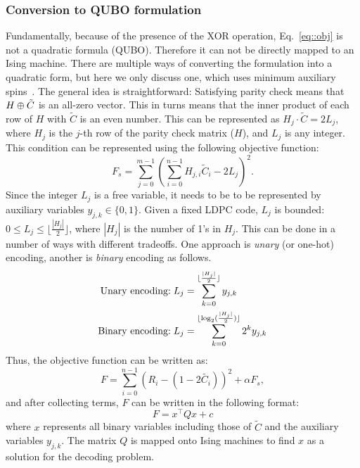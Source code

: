 \subsubsection{Conversion to QUBO formulation}
Fundamentally, because of the presence of the XOR operation, Eq.~\ref{eq::obj}
is not a quadratic formula (\eg QUBO). Therefore it can not be directly mapped
to an Ising machine. There are multiple ways of converting the formulation into
a quadratic form, but here we only discuss one, which uses minimum auxiliary
spins~\cite{tawada2020new}. The general idea is straightforward: Satisfying
parity check means that $H\oplus \tilde{C}$ is an all-zero vector. This in turns
means that the inner product of each row of $H$ with $\tilde{C}$ is an
even number. This can be represented as $H_j \cdot \tilde{C} = 2L_j$, where
$H_j$ is the $j$-th row of the parity check matrix ($H$), and $L_j$ is any integer.
This condition can be represented using the following objective function:
\begin{equation}
    F_s = \sum_{j=0}^{m-1}(\sum_{i=0}^{n-1} H_{j,i}\tilde{C}_i - 2L_j)^2.
\end{equation}
Since the integer $L_j$ is a free variable, it needs to be
to be represented by auxiliary variables $y_{j,k}\in \{0,1\}$. 
Given a fixed LDPC code, $L_j$ is
bounded: $0 \leq L_j \leq \lfloor \frac{|H_j|}{2} \rfloor $, where $|H_j|$
is the number of 1’s in $H_j$. 
This can be done in a number of ways with different tradeoffs. One approach is
\emph{unary} (or one-hot) encoding, another is \emph{binary} encoding as follows.
\begin{equation}\label{eq:unary_binary}
\begin{split}
    \text{Unary encoding:\;}&  L_j = \sum_{k=0}^{\lfloor \frac{|H_j|}{2} \rfloor} y_{j,k} \\
    \text{Binary encoding:\;}&
             L_j = \sum_{k=0}^{\lfloor \log_2 (\frac{|H_j|}{2})\rfloor} 2^k y_{j,k}
\end{split}
\end{equation}
Thus, the objective function can be written as: 
\begin{equation}
\label{eq::obj_ising}
    F = \sum_{i=0}^{n-1}\left(R_i - (1-2\tilde{C_i})\right)^2 + \alpha F_s,
\end{equation}
and after collecting terms,
$F$ can be written in the following format: 
\begin{equation}
F = x^\top Qx +c 
\end{equation}
where $x$ represents all binary variables including those of $\tilde{C}$ and the auxiliary variables $y_{j,k}$. The matrix $Q$ is mapped onto Ising machines to find $x$ as a solution for the decoding problem.

